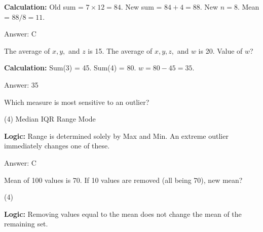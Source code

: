 \documentclass[11pt,paper=a4,answers]{exam}
\begin{document}
\begin{questions}
\begin{solution}
\textbf{Calculation:} Old sum = $7 \times 12 = 84$. New sum = $84 + 4 = 88$. New $n = 8$. Mean = $88/8 = 11$.

\vspace{30pt}

Answer: \colorbox{yellow!100}{C}
\end{solution}

\vspace{60pt}

\question
The average of $x, y,$ and $z$ is 15. The average of $x, y, z,$ and $w$ is 20. Value of $w$?

\begin{solution}
\textbf{Calculation:} Sum(3) = 45. Sum(4) = 80. $w = 80 - 45 = 35$.

\vspace{30pt}

Answer: \colorbox{yellow!100}{35}
\end{solution}

\vspace{60pt}

\question
Which measure is most sensitive to an outlier?
\begin{tasks}(4)
    \task Median
    \task IQR
    \task Range
    \task Mode
\end{tasks}

\begin{solution}
\textbf{Logic:} Range is determined solely by Max and Min. An extreme outlier immediately changes one of these.

\vspace{30pt}

Answer: \colorbox{yellow!100}{C}
\end{solution}

\vspace{60pt}

\question
Mean of 100 values is 70. If 10 values are removed (all being 70), new mean?
\begin{tasks}(4)
\end{tasks}

\begin{solution}
\textbf{Logic:} Removing values equal to the mean does not change the mean of the remaining set.


\end{solution}
\end{questions}
\end{document}
